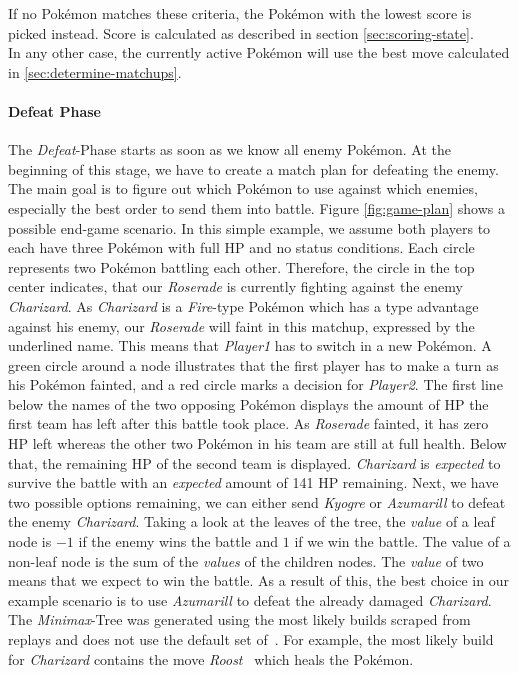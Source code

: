 If no Pokémon matches these criteria, the Pokémon with the lowest score is picked instead.
Score is calculated as described in section \ref{sec:scoring-state}. \\
In any other case, the currently active Pokémon will use the best move calculated in \ref{sec:determine-matchups}.

\paragraph{Defeat Phase}
\label{sec:defeat-phase}
The \textit{Defeat}-Phase starts as soon as we know all enemy Pokémon. At the beginning of this stage, we have to create
a match plan for defeating the enemy. The main goal is to figure out which Pokémon to use against which enemies, especially
the best order to send them into battle. 
Figure \ref{fig:game-plan} shows a possible end-game scenario. In this simple example, we assume both players to each
have three Pokémon with full \ac{HP} and no status conditions. Each circle represents two Pokémon battling each other.
Therefore, the circle in the top center indicates, that our \textit{Roserade} is currently fighting against the enemy
\textit{Charizard}. As \textit{Charizard} is a \textit{Fire}-type Pokémon which has a type advantage against his enemy,
our \textit{Roserade} will faint in this matchup, expressed by the underlined name. This means that \textit{Player1} has to
switch in a new Pokémon. A green circle around a node illustrates that the first player has to make a turn as his 
Pokémon fainted, and a red circle marks a decision for \textit{Player2}. The first line below the names of the two opposing
Pokémon displays the amount of \ac{HP} the first team has left after this battle took place. As \textit{Roserade} fainted,
it has zero \ac{HP} left whereas the other two Pokémon in his team are still at full health. Below that, the remaining 
\ac{HP} of the second team is displayed. \textit{Charizard} is \textit{expected} to survive the battle with an 
\textit{expected} amount of 141 \ac{HP} remaining. Next, we have two possible options remaining, we can either send
\textit{Kyogre} or \textit{Azumarill} to defeat the enemy \textit{Charizard}. Taking a look at the leaves of the tree,
the \textit{value} of a leaf node is $-1$ if the enemy wins the battle and $1$ if we win the battle. 
The value of a non-leaf node is the sum of the \textit{values} of the children nodes. The \textit{value} of two means that we 
expect to win the battle. As a result of this, the best choice in our example scenario is to use \textit{Azumarill} to 
defeat the already damaged \textit{Charizard}. The \textit{Minimax}-Tree was generated using the most likely builds
scraped from replays and does not use the default set of~\cite{Smogon:DamageCalc}. For example, 
the most likely build for \textit{Charizard} contains the move \textit{Roost}~\autocite{Bulbapedia:Roost} which 
heals the Pokémon.

